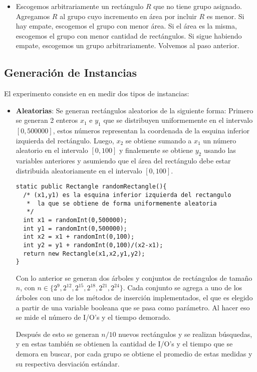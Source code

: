 \documentclass[letterpaper,12pt]{article}
\begin{document}
\begin{itemize}
\begin{itemize}
\item Escogemos arbitrariamente un rect\'angulo $R$ que no tiene grupo asignado. Agregamos $R$ al grupo cuyo incremento en \'area por incluir $R$ es menor. Si hay empate, escogemos el grupo con menor \'area. Si el \'area es la misma, escogemos el grupo con menor cantidad de rect\'angulos. Si sigue habiendo empate, escogemos un grupo arbitrariamente. Volvemos al paso anterior.
\end{itemize}
\end{itemize}
\subsection{Generaci\'on de Instancias}

El experimento consiste en en medir dos tipos de instancias:
\begin{itemize}
\item \textbf{Aleatorias}: Se generan rect\'angulos aleatorios de la siguiente forma: Primero se generan 2 enteros $x_1$ e $y_1$ que se distribuyen uniformemente en el intervalo $[0,500000]$, estos n\'umeros representan la coordenada de la esquina inferior izquierda del rect\'angulo. Luego, $x_2$ se obtiene sumando a $x_1$ un n\'umero aleatorio en el intervalo $[0,100]$ y finalemente se obtiene $y_2$ usando las variables anteriores y asumiendo que el \'area del rect\'angulo debe estar distribuida aleatoriamente en el intervalo $[0,100]$.

\lstset{language=Java, breaklines=true, basicstyle=\footnotesize}
\begin{lstlisting}[frame=single]
static public Rectangle randomRectangle(){
  /* (x1,y1) es la esquina inferior izquierda del rectangulo
   *  la que se obtiene de forma uniformemente aleatoria
   */
  int x1 = randomInt(0,500000);
  int y1 = randomInt(0,500000);
  int x2 = x1 + randomInt(0,100);
  int y2 = y1 + randomInt(0,100)/(x2-x1);
  return new Rectangle(x1,x2,y1,y2);
}
\end{lstlisting}

Con lo anterior se generan dos \'arboles y conjuntos de rect\'angulos de tama\~no $n$, con $n \in \{2^9,2^{12},2^{15},2^{18},2^{21},2^{24}\}$. Cada conjunto se agrega a uno de los \'arboles con uno de los m\'etodos de inserci\'on implementados, el que es elegido a partir de una variable booleana que se pasa como par\'ametro. Al hacer eso se mide el n\'umero de I/O's y el tiempo demorado.

Despu\'es de esto se generan $n/10$ nuevos rect\'angulos y se realizan b\'usquedas, y en estas tambi\'en se obtienen la cantidad de I/O's y el tiempo que se demora en buscar, por cada grupo se obtiene el promedio de estas medidas y su respectiva desviaci\'on est\'andar.

\end{itemize}
\end{document}

